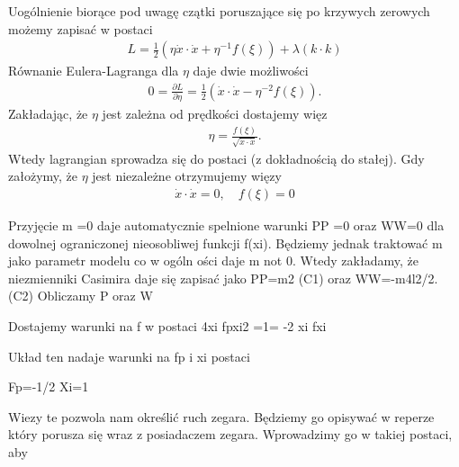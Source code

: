 Uogólnienie biorące pod uwagę czątki poruszające się
po krzywych zerowych możemy zapisać w 
postaci~\cite{polchinski_1998}
\begin{align}
L =  \frac{1}{2} \left(  
\eta \dot{x} \cdot \dot{x} +  \eta^{-1} f( \xi ) \right)  
+ \lambda ( k\cdot k )
\end{align}
Równanie Eulera-Lagranga dla $\eta$ daje dwie możliwości
\begin{align}
0 = \frac{\partial L }{\partial \eta} =  \frac{1}{2}
\left( \dot{x} \cdot \dot{x} -
\eta^{-2} f(\xi)  \right).
\end{align}
Zakładając, że $\eta$ jest zależna od prędkości 
dostajemy więz
\begin{align*}
\eta = \frac{f(\xi)}{\sqrt{\dot{x} \cdot \dot{x}}}.
\end{align*}
Wtedy lagrangian sprowadza się do postaci
(z dokładnością do stałej).
Gdy założymy, że $\eta$ jest niezależne otrzymujemy
więzy 
\begin{align}
\dot{x} \cdot \dot{x} = 0, \quad f(\xi) = 0
\end{align}





Przyjęcie m =0 daje automatycznie spelnione warunki 
PP =0 oraz WW=0 dla dowolnej ograniczonej nieosobliwej 
funkcji f(xi). Będziemy jednak traktować m jako parametr 
modelu co w ogóln ości daje m not 0. Wtedy zakładamy, 
że niezmienniki Casimira daje się zapisać jako PP=m2 (C1) 
oraz WW=-m4l2/2. (C2)
Obliczamy P oraz W

 Dostajemy warunki na f w postaci
4xi fpxi2 =1=
-2 xi fxi

Układ ten nadaje warunki na fp i xi postaci

Fp=-1/2
Xi=1

Wiezy te pozwola nam określić ruch zegara. 
Będziemy go opisywać w reperze który porusza się 
wraz z posiadaczem zegara. 
Wprowadzimy go w takiej postaci, aby 
